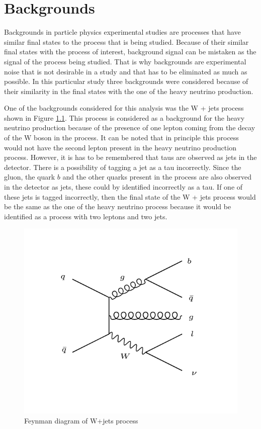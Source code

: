 \graphicspath{{Backgrounds/Figures/}}

\chapter{Backgrounds}\label{chapter: backgrounds}

Backgrounds in particle physics experimental studies are processes that have similar final states to the process that is being studied. Because of their similar final states with the process of interest, background signal can be mistaken as the signal of the process being studied. That is why backgrounds are experimental noise that is not desirable in a study and that has to be eliminated as much as possible. In this particular study three backgrounds were considered because of their similarity in the final states with the one of the heavy neutrino production. 

One of the backgrounds considered for this analysis was the W + jets process shown in Figure \ref{fig: Wjets_background}. This process is considered as a background for the heavy neutrino production because of the presence of one lepton coming from the decay of the W boson in the process. It can be noted that in principle this process would not have the second lepton present in the heavy neutrino production process. However, it is has to be remembered that taus are observed as jets in the detector. There is a possibility of tagging a jet as a tau incorrectly. Since the gluon, the quark $b$ and the other quarks present in the process are also observed in the detector as jets, these could by identified incorrectly as a tau. If one of these jets is tagged incorrectly, then the final state of the W + jets process would be the same as the one of the heavy neutrino process because it would be identified as a process with two leptons and two jets. 

\begin{figure}[H]
\centering
\includegraphics[width = \linewidth]{Wjets}
\caption{Feynman diagram of W+jets process}
\label{fig: Wjets_background}
\end{figure}



